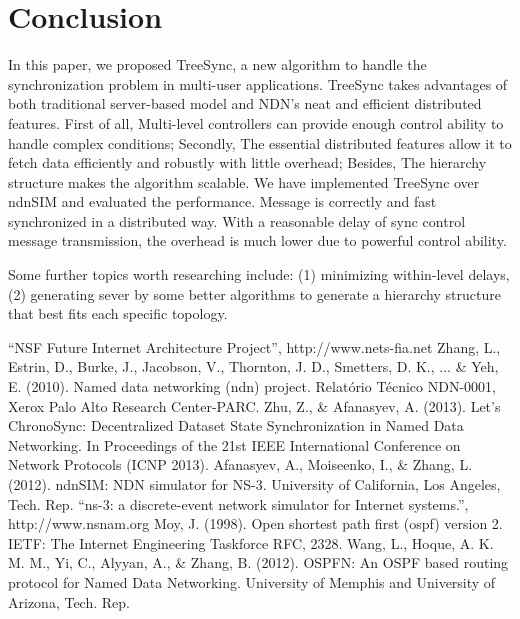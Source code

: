 \documentclass[conference]{IEEEtran}
\begin{document}
\section{Conclusion}
\label{conclusion}
In this paper, we proposed TreeSync, a new algorithm to handle the synchronization problem in multi-user applications.
TreeSync takes advantages of both traditional server-based model and NDN's neat and efficient distributed features.
First of all, Multi-level controllers can provide enough control ability to handle complex conditions;
Secondly, The essential distributed features allow it to fetch data efficiently and robustly with little overhead;
Besides, The hierarchy structure makes the algorithm scalable.
We have implemented TreeSync over ndnSIM and evaluated the performance.
Message is correctly and fast synchronized in a distributed way.
With a reasonable delay of sync control message transmission,
the overhead is much lower due to powerful control ability.

Some further topics worth researching include:
(1) minimizing within-level delays,
(2) generating sever by some better algorithms to generate a hierarchy structure
that best fits each specific topology.

\begin{thebibliography}{1}

``NSF Future Internet Architecture Project'', http://www.nets-fia.net
Zhang, L., Estrin, D., Burke, J., Jacobson, V., Thornton, J. D., Smetters, D. K., ... \& Yeh, E. (2010).
Named data networking (ndn) project. Relatório Técnico NDN-0001, Xerox Palo Alto Research Center-PARC.
Zhu, Z., \& Afanasyev, A. (2013).
Let’s ChronoSync: Decentralized Dataset State Synchronization in Named Data Networking.
In Proceedings of the 21st IEEE International Conference on Network Protocols (ICNP 2013).
Afanasyev, A., Moiseenko, I., \& Zhang, L. (2012).
ndnSIM: NDN simulator for NS-3. University of California, Los Angeles, Tech. Rep.
``ns-3: a discrete-event network simulator for Internet systems.'', http://www.nsnam.org
Moy, J. (1998). Open shortest path first (ospf) version 2. IETF: The Internet Engineering Taskforce RFC, 2328.
Wang, L., Hoque, A. K. M. M., Yi, C., Alyyan, A., \& Zhang, B. (2012).
OSPFN: An OSPF based routing protocol for Named Data Networking.
University of Memphis and University of Arizona, Tech. Rep.
\end{thebibliography}
\end{document}
